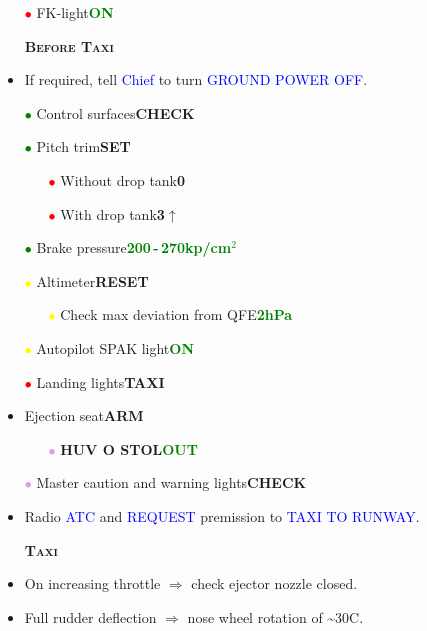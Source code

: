 \documentclass[a4paper,12pt,dvipsnames]{letter}
\newcommand{\oranb}[1]{\textcolor{BurntOrange} {\textbf{#1}}}
\newcommand{\radio}[1]{\textcolor{blue}{#1}}
\newcommand{\button}[1]{\textbf{#1}}
\newcommand{\degC}{\textdegree{}C}
\newcommand{\ok}[1]{\textcolor{Green}{\textbf{#1}}}
\newcommand{\myHead}[1]{{\LARGE\textsc{\textbf{#1}}}}
\newcommand{\ri}{\textcolor{red}{$\bullet$\;}}
\newcommand{\gi}{\textcolor{Green}{$\bullet$\;}}
\newcommand{\yi}{\textcolor{Yellow}{$\bullet$\;}}
\newcommand{\vi}{\textcolor{Plum}{$\bullet$\;}}
\begin{document}
{\begin{itemize}
\begin{itemize}
  \item[\ri] FK-light\dotfill\ok{ON}
 \end{itemize}
\end{itemize}
\newpage
\begin{itemize}
 \item[] \myHead{Before Taxi}
 \item If required, tell \radio{Chief} to turn \radio{GROUND POWER OFF}.
 \item[\gi] Control surfaces\dotfill\button{CHECK}
 \item[\gi] Pitch trim\dotfill\button{SET}
 \begin{itemize}
  \item[\ri] Without drop tank\dotfill\button{0\textdegree}
  \item[\ri] With drop tank\dotfill\button{3\textdegree\;$\uparrow$}
 \end{itemize}
 \item[\gi] Brake pressure\dotfill\ok{200\,-\,270\;kp/cm$^2$}
 \item[\yi] Altimeter\dotfill\button{RESET}
 \begin{itemize}
  \item[\yi] Check max deviation from QFE\dotfill\ok{2\;hPa}
 \end{itemize}
 \item[\yi] Autopilot SPAK light\dotfill\ok{ON}
 \item[\ri] Landing lights\dotfill\button{TAXI}
 \item Ejection seat\dotfill\button{ARM}
 \begin{itemize}
  \item[\vi] \oranb{HUV O STOL}\dotfill\ok{OUT}
 \end{itemize}
 \item[\vi] Master caution and warning lights\dotfill\button{CHECK}
 \item Radio \radio{ATC} and \radio{REQUEST} premission to \radio{TAXI TO RUNWAY}.
\end{itemize}
\begin{itemize}
 \item[]
 \item[] \myHead{Taxi}
 \item On increasing throttle $\Rightarrow$ check ejector nozzle closed.
 \item Full rudder deflection $\Rightarrow$ nose wheel rotation of \textasciitilde 30\degC.

\end{itemize}}
\end{document}
